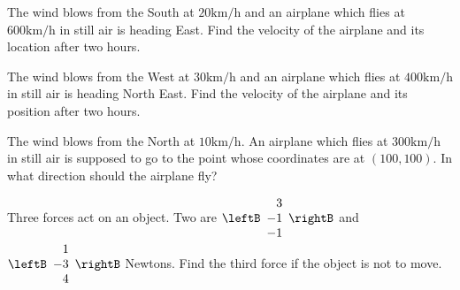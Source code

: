 \begin{enumialphparenastyle}

\begin{ex} The wind blows from the South at $20\textrm{km}/\textrm{h}$ and an
airplane which flies at $600\textrm{km}/\textrm{h}$ in still air is heading
East. Find the velocity of the airplane and its location after
two hours. \vspace{1mm}
\end{ex}

\begin{ex} The wind blows from the West at $30\textrm{km}/\textrm{h}$ and an
airplane which flies at $400\textrm{km}/\textrm{h}$ in still air is heading
North East. Find the velocity of the airplane and its position
after two hours. \vspace{1mm}
\end{ex}

\begin{ex} The wind blows from the North at $10\textrm{km}/\textrm{h}$. An
airplane which flies at $300\textrm{km}/\textrm{h}$ in still air is supposed
to go to the point whose coordinates are at $\left( 100, 100 \right). $ In what direction should the airplane fly? \vspace{1mm}
\end{ex}

\begin{ex} Three forces act on an object. Two are $\leftB
\begin{array}{r}
3 \\
-1 \\
-1
\end{array}
\rightB $ and $\leftB
\begin{array}{r}
1 \\
-3 \\
4
\end{array}
\rightB $ Newtons. Find the third force if the object is not to move.
\vspace{1mm}
\end{ex}


\end{enumialphparenastyle}
